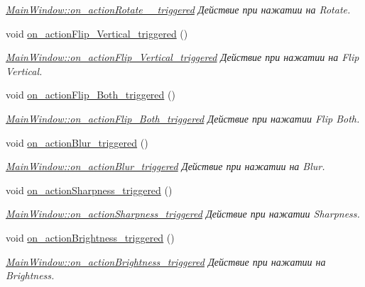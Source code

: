 \begin{DoxyCompactItemize}
\begin{DoxyCompactList}\small\item\em \hyperlink{class_main_window_af22425cb6431dde120a5600dc8fc12cd}{Main\+Window\+::on\+\_\+action\+Rotate\+\_\+\_\+triggered} Действие при нажатии на Rotate. \end{DoxyCompactList}\item 
void \hyperlink{class_main_window_a0afe6cf3aedc8b8c1538e2d2fad20419}{on\+\_\+action\+Flip\+\_\+\+Vertical\+\_\+triggered} ()
\begin{DoxyCompactList}\small\item\em \hyperlink{class_main_window_a0afe6cf3aedc8b8c1538e2d2fad20419}{Main\+Window\+::on\+\_\+action\+Flip\+\_\+\+Vertical\+\_\+triggered} Действие при нажатии на Flip Vertical. \end{DoxyCompactList}\item 
void \hyperlink{class_main_window_a62a84e467acdc89e7ca7dc23e7ba3a06}{on\+\_\+action\+Flip\+\_\+\+Both\+\_\+triggered} ()
\begin{DoxyCompactList}\small\item\em \hyperlink{class_main_window_a62a84e467acdc89e7ca7dc23e7ba3a06}{Main\+Window\+::on\+\_\+action\+Flip\+\_\+\+Both\+\_\+triggered} Действие при нажатии Flip Both. \end{DoxyCompactList}\item 
void \hyperlink{class_main_window_af5e879453e86142ec7d2ef0bd9d7942e}{on\+\_\+action\+Blur\+\_\+triggered} ()
\begin{DoxyCompactList}\small\item\em \hyperlink{class_main_window_af5e879453e86142ec7d2ef0bd9d7942e}{Main\+Window\+::on\+\_\+action\+Blur\+\_\+triggered} Действие при нажатии на Blur. \end{DoxyCompactList}\item 
void \hyperlink{class_main_window_ab800a26f2166a3abc44e56b6c20e73ce}{on\+\_\+action\+Sharpness\+\_\+triggered} ()
\begin{DoxyCompactList}\small\item\em \hyperlink{class_main_window_ab800a26f2166a3abc44e56b6c20e73ce}{Main\+Window\+::on\+\_\+action\+Sharpness\+\_\+triggered} Действие при нажатии Sharpness. \end{DoxyCompactList}\item 
void \hyperlink{class_main_window_a4f3b679e3802857430db0effee297a60}{on\+\_\+action\+Brightness\+\_\+triggered} ()
\begin{DoxyCompactList}\small\item\em \hyperlink{class_main_window_a4f3b679e3802857430db0effee297a60}{Main\+Window\+::on\+\_\+action\+Brightness\+\_\+triggered} Действие при нажатии на Brightness. \end{DoxyCompactList}\item 

\end{DoxyCompactItemize}
